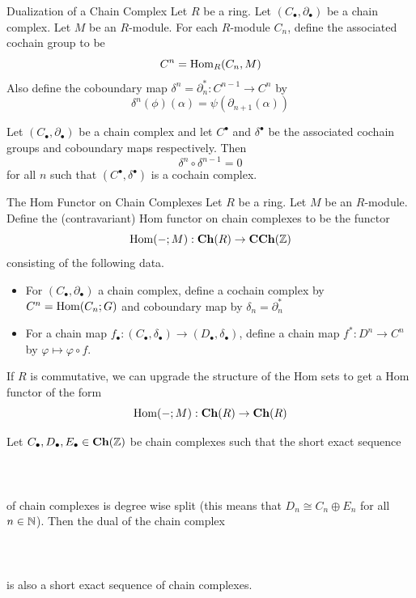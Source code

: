 \documentclass[a4paper]{article}
\begin{document}
\begin{defn}{Dualization of a Chain Complex}{} Let $R$ be a ring. Let $(C_\bullet,\partial_\bullet)$ be a chain complex. Let $M$ be an $R$-module. For each $R$-module $C_n$, define the associated cochain group to be $$C^n=\operatorname{Hom}_R(C_n,M)$$ Also define the coboundary map $\delta^n=\partial_n^\ast:C^{n-1}\to C^n$ by $$\delta^n(\phi)(\alpha)=\psi(\partial_{n+1}(\alpha))$$
\end{defn}

\begin{lmm}{}{} Let $(C_\bullet,\partial_\bullet)$ be a chain complex and let $C^\bullet$ and $\delta^\bullet$ be the associated cochain groups and coboundary maps respectively. Then $$\delta^n\circ\delta^{n-1}=0$$ for all $n$ such that $(C^\bullet,\delta^\bullet)$ is a cochain complex. 
\end{lmm}

\begin{defn}{The Hom Functor on Chain Complexes}{} Let $R$ be a ring. Let $M$ be an $R$-module. Define the (contravariant) Hom functor on chain complexes to be the functor $$\operatorname{Hom}(-;M):\bold{Ch}(R)\to\bold{CCh}(\mathbb{Z})$$ consisting of the following data. 
\begin{itemize}
\item For $(C_\bullet,\partial_\bullet)$ a chain complex, define a cochain complex by $C^n=\operatorname{Hom}(C_n;G)$ and coboundary map by $\delta_n=\partial_n^\ast$
\item For a chain map $f_\bullet:(C_\bullet,\delta_\bullet)\to(D_\bullet,\delta_\bullet)$, define a chain map $f^\ast:D^n\to C^n$ by $\varphi\mapsto\varphi\circ f$. 
\end{itemize}
\end{defn}

If $R$ is commutative, we can upgrade the structure of the Hom sets to get a Hom functor of the form $$\operatorname{Hom}(-;M):\bold{Ch}(R)\to\bold{Ch}(R)$$

\begin{prp}{}{} Let $C_\bullet,D_\bullet,E_\bullet\in\bold{Ch}(\mathbb{Z})$ be chain complexes such that the short exact sequence \\~\\
\\~\\
of chain complexes is degree wise split (this means that $D_n\cong C_n\oplus E_n$ for all $n\in\mathbb{N}$). Then the dual of the chain complex \\~\\
\\~\\
is also a short exact sequence of chain complexes. 
\end{prp}
\end{document}
